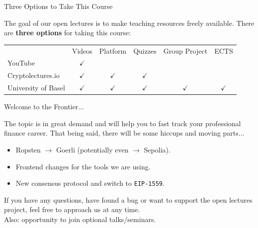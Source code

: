\documentclass[handout]{beamer}
\begin{document}
\begin{frame}{Three Options to Take This Course}

The goal of our open lectures is to make teaching resources freely available. There are \color{focus} \textbf{three options} \color{black} for taking this course:\vspace{1em}

\begin{table}\footnotesize
	\begin{tabular}{lccccc}
	\hline \hline
									& Videos 		& Platform 		& Quizzes  		& Group Project	& ECTS 			\\ \cline{2-6}
		YouTube 	 				& $\checkmark$	& 				& 				& 				&				\\
		Cryptolectures.io 			& $\checkmark$	& $\checkmark$	& $\checkmark$	&				&				\\
		University of Basel			& $\checkmark$	& $\checkmark$	& $\checkmark$	& $\checkmark$	&$\checkmark$	\\
		\hline \hline
	\end{tabular}
\end{table} \vspace{2em}


\end{frame}

\begin{frame}{Welcome to the Frontier...}

The topic is in great demand and will help you to fast track your professional finance career. That being said, there will be \color{focus} some hiccups and moving parts... \color{black} \vspace{1em} 
	\begin{itemize}
		\item Ropsten $\rightarrow$ Goerli (potentially even $\rightarrow$ Sepolia).
		\item Frontend changes for the tools we are using. 
		\item New consensus protocol and switch to \texttt{EIP-1559}.
	\end{itemize}	
	
	\vspace{2em}
	
If you have any questions, have found a bug or want to support the open lectures project, feel free to approach us at any time. \\

\vspace{1em}
Also: opportunity to join optional talks/seminars.
	
\end{frame}
\end{document}
